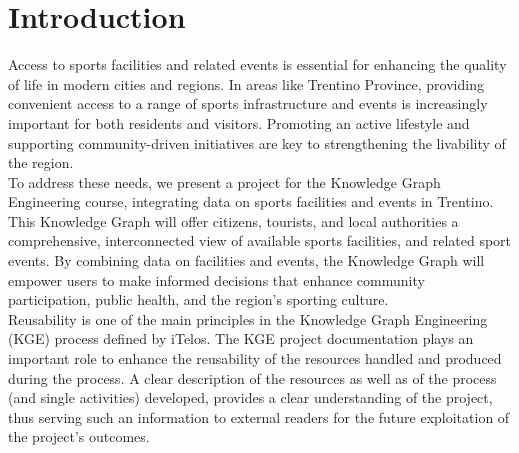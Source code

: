 \section{Introduction}

\noindent Access to sports facilities and related events is essential for enhancing the quality of life in modern cities and regions. In areas like Trentino Province, providing convenient access to a range of sports infrastructure and events is increasingly important for both residents and visitors. Promoting an active lifestyle and supporting community-driven initiatives are key to strengthening the livability of the region.\\

\noindent To address these needs, we present a project for the Knowledge Graph Engineering course, integrating data on sports facilities and events in Trentino. This Knowledge Graph will offer citizens, tourists, and local authorities a comprehensive, interconnected view of available sports facilities, and related sport events. By combining data on facilities and events, the Knowledge Graph will empower users to make informed decisions that enhance community participation, public health, and the region’s sporting culture.\\

\noindent Reusability is one of the main principles in the Knowledge Graph Engineering (KGE) process defined by iTelos. The KGE project documentation plays an important role to enhance the reusability of the resources handled and produced during the process. A clear description
of the resources as well as of the process (and single activities) developed, provides a clear understanding of the project, thus serving such an information to external readers for the future exploitation of the project’s outcomes.\\

